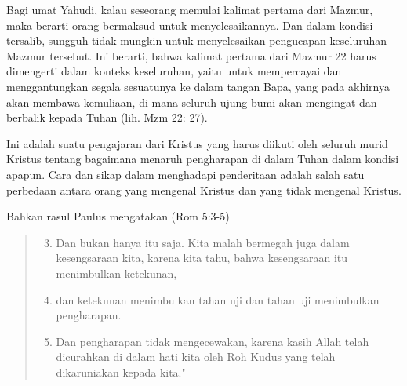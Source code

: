 Bagi umat Yahudi, kalau seseorang memulai kalimat pertama dari Mazmur, maka
berarti orang bermaksud untuk menyelesaikannya. Dan dalam kondisi tersalib,
sungguh tidak mungkin untuk menyelesaikan pengucapan keseluruhan Mazmur
tersebut. Ini berarti, bahwa kalimat pertama dari Mazmur 22 harus dimengerti
dalam konteks keseluruhan, yaitu untuk mempercayai dan menggantungkan segala
sesuatunya ke dalam tangan Bapa, yang pada akhirnya akan membawa kemuliaan, di
mana seluruh ujung bumi akan mengingat dan berbalik kepada Tuhan (lih. Mzm 22:
27). 

Ini adalah suatu pengajaran dari Kristus yang harus diikuti oleh seluruh
murid Kristus tentang bagaimana menaruh pengharapan di dalam Tuhan dalam
kondisi apapun. Cara dan sikap dalam menghadapi penderitaan adalah salah satu
perbedaan antara orang yang mengenal Kristus dan yang tidak mengenal Kristus.

Bahkan rasul Paulus mengatakan (Rom 5:3-5)
\begin{quote} 
\scriptsize
\begin{enumerate}
\setcounter{enumi}{2}

\item Dan bukan hanya itu saja. Kita malah bermegah
juga dalam kesengsaraan kita, karena kita tahu, bahwa kesengsaraan itu
menimbulkan ketekunan, \item  dan ketekunan menimbulkan tahan uji dan tahan uji
menimbulkan pengharapan. \item  Dan pengharapan tidak mengecewakan, karena kasih
Allah telah dicurahkan di dalam hati kita oleh Roh Kudus yang telah
dikaruniakan kepada kita." 
\end{enumerate}
\end{quote}

